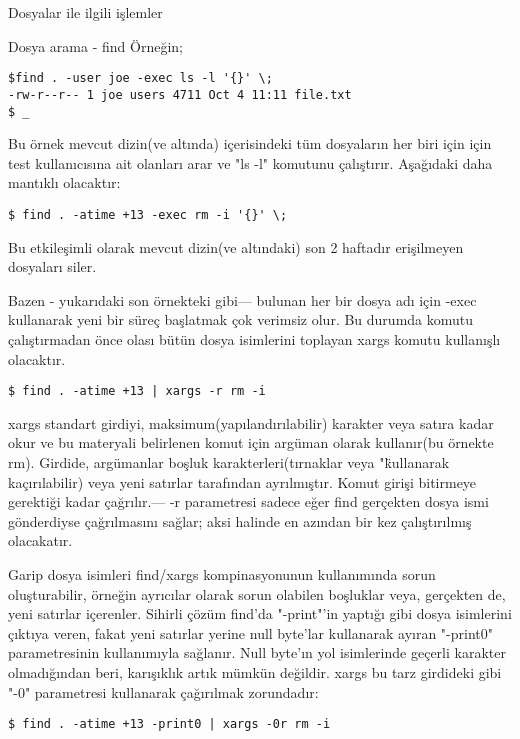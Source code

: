 \documentclass[10pt,a5paper]{book}
\begin{document}
\begin{section}{Dosyalar ile ilgili işlemler}
\begin{subsection}{Dosya arama - find}
Örneğin;
\begin{verbatim}
$find . -user joe -exec ls -l '{}' \;
-rw-r--r-- 1 joe users 4711 Oct 4 11:11 file.txt
$ _
\end{verbatim}

Bu örnek mevcut dizin(ve altında) içerisindeki tüm dosyaların her biri için için test kullanıcısına ait olanları arar ve "ls -l" komutunu çalıştırır. Aşağıdaki daha mantıklı olacaktır:

\begin{verbatim}
$ find . -atime +13 -exec rm -i '{}' \; 
\end{verbatim}

Bu etkileşimli olarak mevcut dizin(ve altındaki) son 2 haftadır erişilmeyen dosyaları siler.

Bazen - yukarıdaki son örnekteki gibi— bulunan her bir dosya adı için -exec kullanarak yeni bir süreç başlatmak çok verimsiz olur. Bu durumda komutu çalıştırmadan önce olası bütün dosya isimlerini toplayan xargs komutu kullanışlı olacaktır.
\begin{verbatim}
$ find . -atime +13 | xargs -r rm -i
\end{verbatim}
xargs standart girdiyi,  maksimum(yapılandırılabilir) karakter veya satıra kadar okur ve bu materyali belirlenen komut için argüman olarak kullanır(bu örnekte rm). Girdide, argümanlar boşluk karakterleri(tırnaklar veya "\" kullanarak kaçırılabilir) veya yeni satırlar tarafından ayrılmıştır. Komut girişi bitirmeye gerektiği kadar çağrılır.— -r parametresi sadece eğer find gerçekten dosya ismi gönderdiyse çağrılmasını sağlar; aksi halinde en azından bir kez çalıştırılmış olacakatır.

Garip dosya isimleri find/xargs kompinasyonunun kullanımında sorun oluşturabilir, örneğin ayrıcılar olarak sorun olabilen boşluklar veya, gerçekten de, yeni satırlar içerenler. Sihirli çözüm find'da "-print"'in yaptığı gibi dosya isimlerini çıktıya veren, fakat yeni satırlar yerine null byte'lar kullanarak ayıran "-print0" parametresinin kullanımıyla sağlanır. Null byte'ın yol isimlerinde geçerli karakter olmadığından beri, karışıklık artık mümkün değildir. xargs bu tarz girdideki gibi "-0" parametresi kullanarak çağırılmak zorundadır:
\begin{verbatim}
$ find . -atime +13 -print0 | xargs -0r rm -i
\end{verbatim}


\end{subsection}
\end{section}
\end{document}
